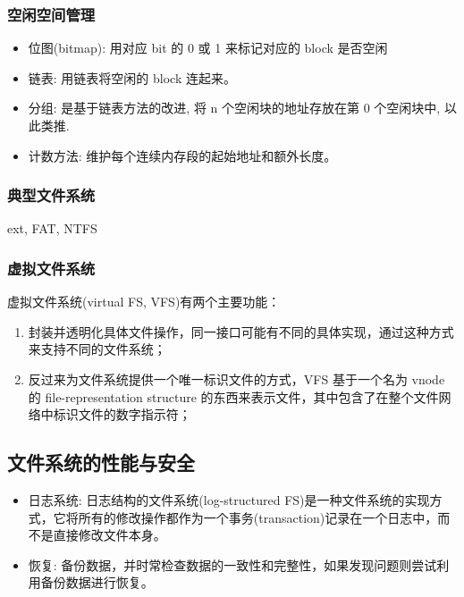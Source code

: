 \subsubsection{空闲空间管理}
\begin{itemize}
    \item {位图(bitmap)}: 用对应 bit 的 0 或 1 来标记对应的 block 是否空闲
    \item 链表: 用链表将空闲的 block 连起来。
    \item 分组: 是基于链表方法的改进, 将 n 个空闲块的地址存放在第 0 个空闲块中, 以此类推. 
    \item 计数方法: 维护每个连续内存段的起始地址和额外长度。
\end{itemize}

\subsubsection{典型文件系统}
ext, FAT, NTFS

\subsubsection{虚拟文件系统}
虚拟文件系统(virtual FS, VFS)有两个主要功能：
\begin{enumerate}
    \item 封装并透明化具体文件操作，同一接口可能有不同的具体实现，通过这种方式来支持不同的文件系统；
    \item 反过来为文件系统提供一个唯一标识文件的方式，VFS 基于一个名为 vnode 的 file-representation structure 的东西来表示文件，其中包含了在整个文件网络中标识文件的数字指示符；
\end{enumerate}

\subsection{文件系统的性能与安全}
\begin{itemize}
    \item 日志系统: 日志结构的文件系统(log-structured FS)是一种文件系统的实现方式，它将所有的修改操作都作为一个事务(transaction)记录在一个日志中，而不是直接修改文件本身。
    \item 恢复: 备份数据，并时常检查数据的一致性和完整性，如果发现问题则尝试利用备份数据进行恢复。
\end{itemize}

